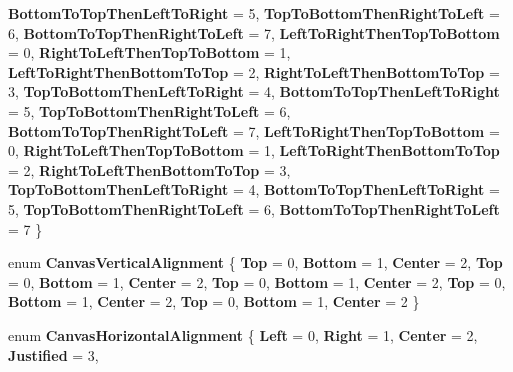 \begin{DoxyCompactItemize}
{\bfseries Bottom\+To\+Top\+Then\+Left\+To\+Right} = 5, 
{\bfseries Top\+To\+Bottom\+Then\+Right\+To\+Left} = 6, 
{\bfseries Bottom\+To\+Top\+Then\+Right\+To\+Left} = 7, 
\newline
{\bfseries Left\+To\+Right\+Then\+Top\+To\+Bottom} = 0, 
{\bfseries Right\+To\+Left\+Then\+Top\+To\+Bottom} = 1, 
{\bfseries Left\+To\+Right\+Then\+Bottom\+To\+Top} = 2, 
{\bfseries Right\+To\+Left\+Then\+Bottom\+To\+Top} = 3, 
\newline
{\bfseries Top\+To\+Bottom\+Then\+Left\+To\+Right} = 4, 
{\bfseries Bottom\+To\+Top\+Then\+Left\+To\+Right} = 5, 
{\bfseries Top\+To\+Bottom\+Then\+Right\+To\+Left} = 6, 
{\bfseries Bottom\+To\+Top\+Then\+Right\+To\+Left} = 7, 
\newline
{\bfseries Left\+To\+Right\+Then\+Top\+To\+Bottom} = 0, 
{\bfseries Right\+To\+Left\+Then\+Top\+To\+Bottom} = 1, 
{\bfseries Left\+To\+Right\+Then\+Bottom\+To\+Top} = 2, 
{\bfseries Right\+To\+Left\+Then\+Bottom\+To\+Top} = 3, 
\newline
{\bfseries Top\+To\+Bottom\+Then\+Left\+To\+Right} = 4, 
{\bfseries Bottom\+To\+Top\+Then\+Left\+To\+Right} = 5, 
{\bfseries Top\+To\+Bottom\+Then\+Right\+To\+Left} = 6, 
{\bfseries Bottom\+To\+Top\+Then\+Right\+To\+Left} = 7
 \}
\item 
\mbox{\label{namespace_microsoft_1_1_graphics_1_1_canvas_1_1_text_a152840fdbab49a06690e74695359e3fd}} 
enum {\bfseries Canvas\+Vertical\+Alignment} \{ \newline
{\bfseries Top} = 0, 
{\bfseries Bottom} = 1, 
{\bfseries Center} = 2, 
{\bfseries Top} = 0, 
\newline
{\bfseries Bottom} = 1, 
{\bfseries Center} = 2, 
{\bfseries Top} = 0, 
{\bfseries Bottom} = 1, 
\newline
{\bfseries Center} = 2, 
{\bfseries Top} = 0, 
{\bfseries Bottom} = 1, 
{\bfseries Center} = 2, 
\newline
{\bfseries Top} = 0, 
{\bfseries Bottom} = 1, 
{\bfseries Center} = 2
 \}
\item 
\mbox{\label{namespace_microsoft_1_1_graphics_1_1_canvas_1_1_text_afbe7037cb35da011cc144d6cb2d328f5}} 
enum {\bfseries Canvas\+Horizontal\+Alignment} \{ \newline
{\bfseries Left} = 0, 
{\bfseries Right} = 1, 
{\bfseries Center} = 2, 
{\bfseries Justified} = 3, 
\newline

\end{DoxyCompactItemize}
